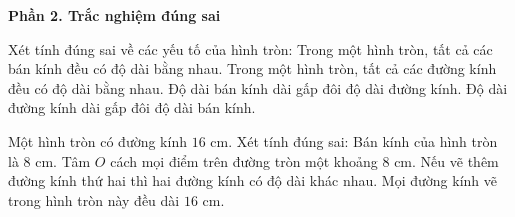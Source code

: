 \textbf{Phần 2. Trắc nghiệm đúng sai}

\begin{ex} %
Xét tính đúng sai về các yếu tố của hình tròn:
\choiceTF
{\True Trong một hình tròn, tất cả các bán kính đều có độ dài bằng nhau.}
{\True Trong một hình tròn, tất cả các đường kính đều có độ dài bằng nhau.}
{Độ dài bán kính dài gấp đôi độ dài đường kính.}
{\True Độ dài đường kính dài gấp đôi độ dài bán kính.}
\end{ex}

\begin{ex} %
Một hình tròn có đường kính $16\text{ cm}$. Xét tính đúng sai:
\choiceTF
{\True Bán kính của hình tròn là $8\text{ cm}$.}
{\True Tâm $O$ cách mọi điểm trên đường tròn một khoảng $8\text{ cm}$.}
{Nếu vẽ thêm đường kính thứ hai thì hai đường kính có độ dài khác nhau.}
{\True Mọi đường kính vẽ trong hình tròn này đều dài $16\text{ cm}$.}
\end{ex}


